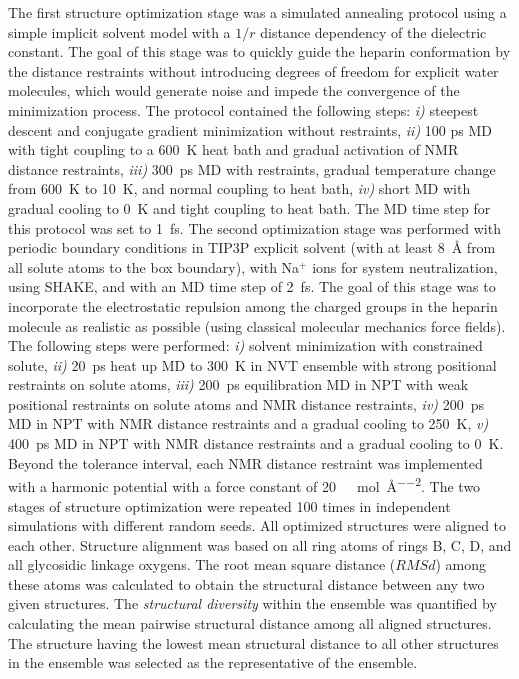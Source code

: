 The first structure optimization stage was a simulated annealing protocol using
a simple implicit solvent model with a $1/r$ distance dependency of the
dielectric constant. The goal of this stage was to quickly guide the heparin
conformation by the distance restraints without introducing degrees of freedom
for explicit water molecules, which would generate noise and impede the
convergence of the minimization process. The protocol contained the following
steps: \textit{i)} steepest descent and conjugate gradient minimization without
restraints, \textit{ii)} 100 ps MD with tight coupling to a \SI{600}{\kelvin}
heat bath and gradual activation of NMR distance restraints, \textit{iii)}
\SI{300}{\pico\second} MD with restraints, gradual temperature change from
\SI{600}{\kelvin} to \SI{10}{\kelvin}, and normal coupling to heat bath,
\textit{iv)} short MD with gradual cooling to \SI{0}{\kelvin} and tight coupling
to heat bath. The MD time step for this protocol was set to
\SI{1}{\femto\second}. The second optimization stage was performed with periodic
boundary conditions in TIP3P explicit solvent (with at least \SI{8}{\angstrom}
from all solute atoms to the box boundary), with Na$^{+}$ ions for system
neutralization, using SHAKE, and with an MD time step of \SI{2}{\femto\second}.
The goal of this stage was to incorporate the electrostatic repulsion among the
charged groups in the heparin molecule as realistic as possible (using classical
molecular mechanics force fields). The following steps were performed:
\textit{i)} solvent minimization with constrained solute, \textit{ii)}
\SI{20}{\pico\second} heat up MD to \SI{300}{\kelvin} in NVT ensemble with
strong positional restraints on solute atoms, \textit{iii)}
\SI{200}{\pico\second} equilibration MD in NPT with weak positional restraints
on solute atoms and NMR distance restraints, \textit{iv)}
\SI{200}{\pico\second} MD in NPT with NMR distance restraints and a gradual
cooling to \SI{250}{\kelvin}, \textit{v)} \SI{400}{\pico\second} MD in NPT with
NMR distance restraints and a gradual cooling to \SI{0}{\kelvin}. Beyond the
tolerance interval, each NMR distance restraint was implemented with a harmonic
potential with a force constant of
\SI{20}{\kilo\calory\per\mole\per\angstrom\squared}. The two stages of structure
optimization were repeated 100 times in independent simulations with different
random seeds. All optimized structures were aligned to each other. Structure
alignment was based on all ring atoms of rings B, C, D, and all glycosidic
linkage oxygens. The root mean square distance ($RMSd$) among these atoms was
calculated to obtain the structural distance between any two given structures.
The \textit{structural diversity} within the ensemble was quantified by
calculating the mean pairwise structural distance among all aligned structures.
The structure having the lowest mean structural distance to all other structures
in the ensemble was selected as the representative of the ensemble.

